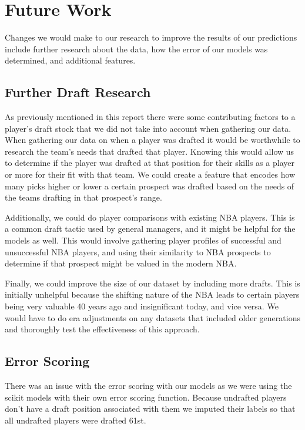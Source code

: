 \documentclass{article}
\begin{document}
\section{Future Work}

Changes we would make to our research to improve the results of our predictions
include further research about the data, how the error of our models was
determined, and additional features.

\subsection{Further Draft Research}

As previously mentioned in this report there were some contributing factors to a
player’s draft stock that we did not take into account when gathering our data.
When gathering our data on when a player was drafted it would be worthwhile to
research the team’s needs that drafted that player. Knowing this would allow us
to determine if the player was drafted at that position for their skills as a
player or more for their fit with that team. We could create a feature that
encodes how many picks higher or lower a certain prospect was drafted based on
the needs of the teams drafting in that prospect's range.

Additionally, we could do player comparisons with existing NBA players. This is
a common draft tactic used by general managers, and it might be helpful for the
models as well. This would involve gathering player profiles of successful and
unsuccessful NBA players, and using their similarity to NBA prospects to
determine if that prospect might be valued in the modern NBA.

Finally, we could improve the size of our dataset by including more drafts. This
is initially unhelpful because the shifting nature of the NBA leads to certain
players being very valuable 40 years ago and insignificant today, and vice
versa. We would have to do era adjustments on any datasets that included older
generations and thoroughly test the effectiveness of this approach.

\subsection{Error Scoring}

There was an issue with the error scoring with our models as we were using the
scikit models with their own error scoring function. Because undrafted players
don’t have a draft position associated with them we imputed their labels so that
all undrafted players were drafted 61st. 
\end{document}
